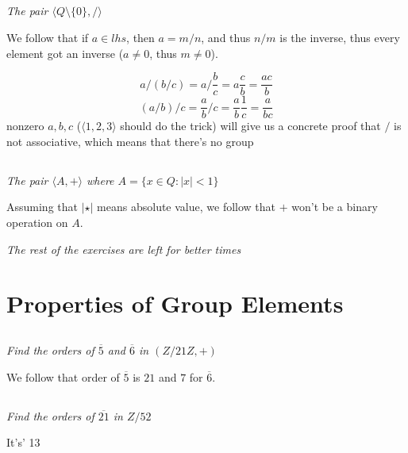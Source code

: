 \documentclass[11pt,oneside,titlepage]{book}
\newcommand{\eangle}[1]{\langle #1 \rangle}
\newcommand{\set}[1]{\{ #1 \}}
\begin{document}
\subsection{}

\textit{The pair $\eangle{Q \setminus \set{0}, /}$}

We follow that if $a \in lhs$, then $a = m/n$, and thus $n/m$ is the inverse, thus every element
got an inverse ($a \neq 0$, thus $m \neq 0$).

$$a / (b / c) = a / \frac{b}{c} = a \frac{c}{b} = \frac{ac}{b}$$
$$(a / b) / c = \frac{a}{b} / c = \frac{a}{b} \frac{1}{c} = \frac{a}{bc}$$
nonzero $a, b, c$ ($\eangle{1, 2, 3}$ should do the trick) will give us a concrete
proof that $/$ is not associative, which means that there's no group

\subsection{}

\textit{The pair $\eangle{A, +}$ where $A = \set{x \in Q: |x| < 1}$}

Assuming that $|\star|$ means absolute value, we follow that $+$ won't be a binary operation on $A$.

\textit{The rest of the exercises are left for better times}

\section{Properties of Group Elements}

\subsection{}

\textit{Find the orders of $\overline{5}$ and $\overline{6}$ in $(Z/21Z, +)$}

We follow that order of $\overline{5}$ is $21$ and $7$ for $\overline{6}$.

\subsection{}

\textit{Find the orders of $\overline{21}$ in $Z/52$}

It's' 13

\subsection{}
\end{document}
